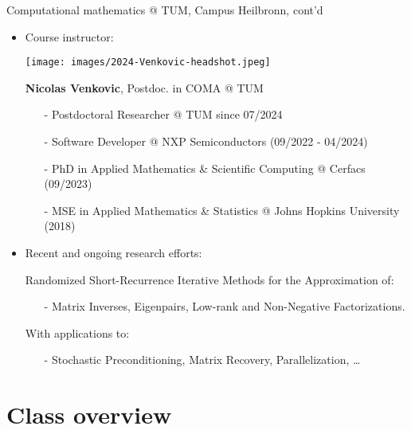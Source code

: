 \documentclass[t,usepdftitle=false]{beamer}
\begin{document}
\begin{frame}{Computational mathematics @ TUM, Campus Heilbronn, cont'd}
\begin{itemize}
\item Course instructor:\vspace{-.2cm}
\begin{center}\texttt{[image: images/2024-Venkovic-headshot.jpeg]}\end{center}\vspace{.15cm}
\textbf{Nicolas Venkovic}, Postdoc. in COMA @ TUM%
\begin{itemize}
\item[-] Postdoctoral Researcher @ TUM since 07/2024\vspace{.07cm}
\item[-] Software Developer @ NXP Semiconductors (09/2022 - 04/2024)\vspace{.07cm}
\item[-] PhD in Applied Mathematics \& Scientific Computing @ Cerfacs (09/2023)\vspace{.07cm}
\item[-] MSE in Applied Mathematics \& Statistics @ Johns Hopkins University (2018)\vspace{.07cm}
\end{itemize}
\item Recent and ongoing research efforts:
\item[] Randomized Short-Recurrence Iterative Methods for the Approximation of:\\
\begin{itemize}\normalsize
\item[-] Matrix Inverses, Eigenpairs, Low-rank and Non-Negative Factorizations.\vspace{.07cm}
\end{itemize}
\item[] With applications to:
\begin{itemize}\normalsize
\item[-] Stochastic Preconditioning, Matrix Recovery, Parallelization, \dots
\end{itemize}
\end{itemize}
\end{frame}


\section{Class overview}
\end{document}
